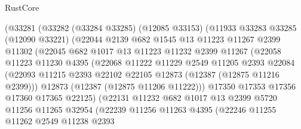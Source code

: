 \begin{lexlean}{RustCore}
\begin{coremodule}
                  (@33281
                    (@33282
                      (@33284 @33285)
                      (@12085 @33153)
                      (@11933
                        @33283
                        @33285
                        (@12090 @33221)
                        (@22044
                          @2139
                          @682
                          @1545
                          @13
                          @11223
                          @11267
                          @2399
                          @11302
                          (@22045
                            @682
                            @1017
                            @13
                            @11223
                            @11232
                            @2399
                            @11267
                            (@22058
                              @11223
                              @11230
                              @4395
                              (@22068
                                @11222
                                @11229
                                @2549
                                @11205
                                @2393
                                @22084
                                (@22093
                                  @11215
                                  @2393
                                  @22102
                                  @22105
                                  @12873
                                  (@12387 (@12875 @11216 @2399)))
                                @12873
                                (@12387 (@12875 @11206 @11222)))
                              @17350
                              @17353
                              @17356
                              @17360
                              @17365
                              @22125)
                            (@22131
                              @11232
                              @682
                              @1017
                              @13
                              @2399
                              @5720
                              @11256
                              @11265
                              @32954
                              (@22239
                                @11256
                                @11263
                                @4395
                                (@22246
                                  @11255
                                  @11262
                                  @2549
                                  @11238
                                  @2393

\end{coremodule}
\end{lexlean}
